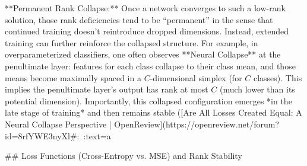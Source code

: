 **Permanent Rank Collapse:** Once a network converges to such a low-rank solution, those rank deficiencies tend to be “permanent” in the sense that continued training doesn’t reintroduce dropped dimensions. Instead, extended training can further reinforce the collapsed structure. For example, in overparameterized classifiers, one often observes **Neural Collapse** at the penultimate layer: features for each class collapse to their class mean, and those means become maximally spaced in a $C$-dimensional simplex (for $C$ classes). This implies the penultimate layer’s output has rank at most $C$ (much lower than its potential dimension). Importantly, this collapsed configuration emerges *in the late stage of training* and then remains stable ([Are All Losses Created Equal: A Neural Collapse Perspective | OpenReview](https://openreview.net/forum?id=8rfYWE3nyXl#:~:text=a%

## Loss Functions (Cross-Entropy vs. MSE) and Rank Stability

